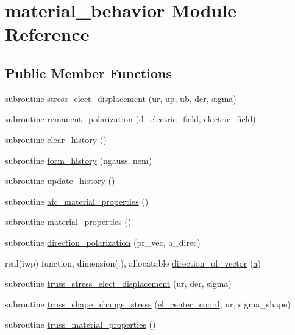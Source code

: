 \hypertarget{classmaterial__behavior}{}\section{material\+\_\+behavior Module Reference}
\label{classmaterial__behavior}
\subsection*{Public Member Functions}
\begin{DoxyCompactItemize}
\item 
subroutine \hyperlink{classmaterial__behavior_a5afdfd92d3c4415fb168bc0c7fe1efa3}{stress\+\_\+elect\+\_\+displacement} (ur, up, ub, der, sigma)
\item 
subroutine \hyperlink{classmaterial__behavior_abe39c2fed400468bdf0c24cfab63c47e}{remanent\+\_\+polarization} (d\+\_\+electric\+\_\+field, \hyperlink{classmaterial__behavior_a3ade0d21c66ab32510bf21daeb7fc6a8}{electric\+\_\+field})
\item 
subroutine \hyperlink{classmaterial__behavior_aeb0d82a9f31dc6853c8afdcb47ec7518}{clear\+\_\+history} ()
\item 
subroutine \hyperlink{classmaterial__behavior_a246cae6f0d929f111e75dc73a5761f58}{form\+\_\+history} (ngauss, nem)
\item 
subroutine \hyperlink{classmaterial__behavior_a7f4afd7183cd41dff13fd4fcbd88a329}{update\+\_\+history} ()
\item 
subroutine \hyperlink{classmaterial__behavior_a0b99a8ea19770cbbe6a3b2256f8bec7c}{afc\+\_\+material\+\_\+properties} ()
\item 
subroutine \hyperlink{classmaterial__behavior_a14a187a01fadfd1f1bf2df5b193cfc6f}{material\+\_\+properties} ()
\item 
subroutine \hyperlink{classmaterial__behavior_a9f66b9f48be07bb1d7e9776ba84b53e4}{direction\+\_\+polarization} (pr\+\_\+vec, a\+\_\+direc)
\item 
real(iwp) function, dimension(\+:), allocatable \hyperlink{classmaterial__behavior_a16bd334e522c38a0ace29e64a0721669}{direction\+\_\+of\+\_\+vector} (\hyperlink{classmaterial__behavior_a7d56504ef4329ab65c4fc86cd108beb4}{a})
\item 
subroutine \hyperlink{classmaterial__behavior_a12b4c943b3e07e083350abd47cba20f8}{truss\+\_\+stress\+\_\+elect\+\_\+displacement} (ur, der, sigma)
\item 
subroutine \hyperlink{classmaterial__behavior_a344f7d5811ee5c48e0589c47ecc694ee}{truss\+\_\+shape\+\_\+change\+\_\+stress} (\hyperlink{classmaterial__behavior_a1deebdb156ef27ce0d628eeadc3ea304}{el\+\_\+center\+\_\+coord}, ur, sigma\+\_\+shape)
\item 
subroutine \hyperlink{classmaterial__behavior_ad7a2d714724a76a76fb80054564aeecd}{truss\+\_\+material\+\_\+properties} ()
\end{DoxyCompactItemize}
